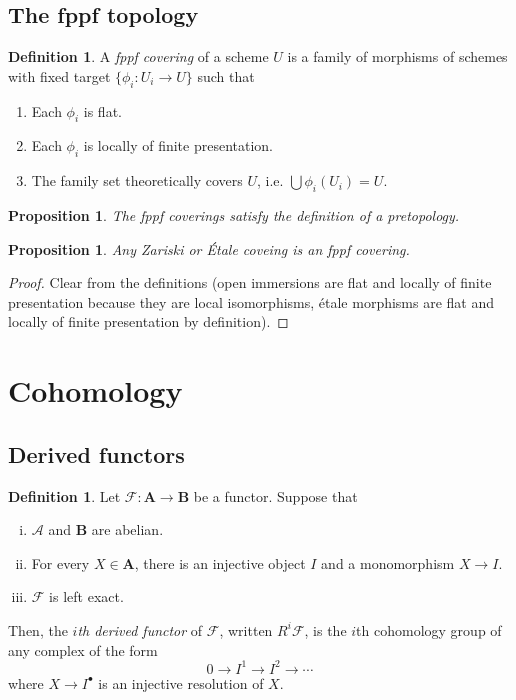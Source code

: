\documentclass{amsart}
\newtheorem{proposition}[theorem]{Proposition}
\theoremstyle{definition}
\newtheorem{definition}[theorem]{Definition}
\theoremstyle{remark}
\begin{document}
\subsection{The fppf topology}

\begin{definition}
    A \textit{fppf covering} of a scheme $U$ is a family of morphisms of schemes
    with fixed target $\{\phi_i : U_i \to U\}$ such that
    \begin{enumerate}
        \item Each $\phi_i$ is flat.
        \item Each $\phi_i$ is locally of finite presentation.
        \item The family set theoretically covers $U$, i.e. $\bigcup \phi_i(U_i)
            = U$.
    \end{enumerate}
\end{definition}

\begin{proposition}
    The fppf coverings satisfy the definition of a pretopology.
\end{proposition}

\begin{proposition}
    Any Zariski or \'Etale coveing is an fppf covering.
\end{proposition}

\begin{proof}
    Clear from the definitions (open immersions are flat and locally of finite
    presentation because they are local isomorphisms, \'etale morphisms are flat
    and locally of finite presentation by definition).
\end{proof}

\section{Cohomology}

\subsection{Derived functors}

\begin{definition}
    Let $\mathcal{F} : \mathbf{A} \to \mathbf{B}$ be a functor. Suppose that
    \begin{enumerate}[(i)]
        \item $\mathcal{A}$ and $\mathbf{B}$ are abelian.
        \item For every $X \in \mathbf{A}$, there is an injective object $I$ and
            a monomorphism $X \to I$.
        \item $\mathcal{F}$ is left exact.
    \end{enumerate}
    Then, the \textit{$i$th derived functor} of $\mathcal{F}$, written $R^i
    \mathcal{F}$, is the $i$th cohomology group of any complex of the form
    \[
        0 \to I^1 \to I^2 \to \cdots
    \]
    where $X \to I^{\bullet}$ is an injective resolution of $X$.
\end{definition}
\end{document}
